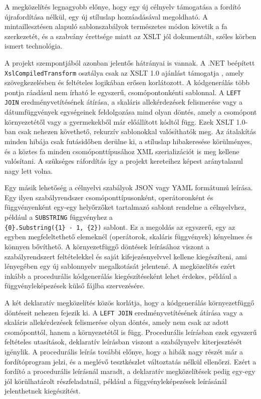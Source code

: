 A megközelítés legnagyobb előnye, hogy egy új célnyelv támogatása a fordító újrafordítása nélkül, egy új stíluslap hozzáadásával megoldható. A mintaillesztésen alapuló sablonszabályok természetes módon követik a fa szerkezetét, és a szabvány érettsége miatt az XSLT jól dokumentált, széles körben ismert technológia.

A projekt szempontjából azonban jelentős hátrányai is vannak. A .NET beépített \\ \texttt{XslCompiledTransform} osztálya csak az XSLT 1.0 ajánlást támogatja \cite{mslearn2024xslt}, amely szövegkezelésben és feltételes logikában erősen korlátozott. A kódgenerálás több pontja ráadásul nem írható le egyszerű, csomópontonkénti sablonnal. A \texttt{LEFT JOIN} eredményvetítésének átírása, a skaláris allekérdezések felismerése vagy a dátumfüggvények egységeinek feldolgozása mind olyan döntés, amely a csomópont környezetétől vagy a gyermekekből már előállított kódtól függ. Ezek XSLT 1.0-ban csak nehezen követhető, rekurzív sablonokkal valósíthatók meg. Az átalakítás minden hibája csak futásidőben derülne ki, a stíluslap hibakeresése körülményes, és a köztes fa minden csomóponttípusához XML szerializációt is meg kellene valósítani. A szükséges ráfordítás így a projekt kereteihez képest aránytalanul nagy lett volna.


Egy másik lehetőség a célnyelvi szabályok JSON vagy YAML formátumú leírása. Egy ilyen szabályrendszer csomóponttípusonként, operátoronként és függvényenként egy-egy helyőrzőket tartalmazó sablont rendelne a célnyelvhez, például a \texttt{SUBSTRING} függvényhez a \\ \texttt{\{0\}.Substring(\{1\} - 1, \{2\})} sablont. Ez a megoldás az egyszerű, egy az egyben megfeleltethető elemeknél (operátorok, skaláris függvények) kényelmes és könnyen bővíthető. A környezetfüggő döntések leírásához viszont a szabályrendszert feltételekkel és saját kifejezésnyelvvel kellene kiegészíteni, ami lényegében egy új sablonnyelv megalkotását jelentené. A megközelítés ezért inkább a procedurális kódgenerálás kiegészítéseként lehet érdekes, például a függvényleképezések külső fájlba szervezésére.


A két deklaratív megközelítés közös korlátja, hogy a kódgenerálás környezetfüggő döntéseit nehezen fejezik ki. A \texttt{LEFT JOIN} eredményvetítésének átírása vagy a skaláris allekérdezések felismerése olyan döntés, amely nem csak az adott csomóponttól, hanem a környezetétől is függ. Procedurális leírásban ezek egyszerű feltételes utasítások, deklaratív leírásban viszont a szabálynyelv kiterjesztését igénylik. A procedurális leírás további előnye, hogy a hibák nagy részét már a fordítóprogram jelzi, és a meglévő tesztkészlet változtatás nélkül ellenőrzi. Ezért a fordító a procedurális leírásnál maradt, a deklaratív megközelítések pedig egy-egy jól körülhatárolt részfeladatnál, például a függvényleképezések leírásánál jelenthetnek kiegészítést.

